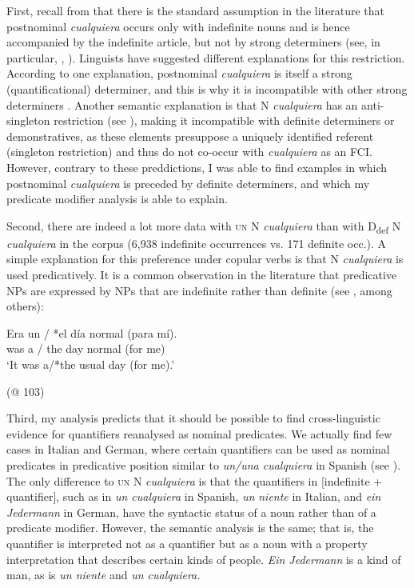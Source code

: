 {First, recall from  that there is the standard assumption in the literature that postnominal \textit{cualquiera} occurs only with indefinite nouns and is hence accompanied by the indefinite article, but not by strong determiners (see, in particular, \citealt{Lapesa1964}, \citealt{Rivero2011}). Linguists have suggested different explanations for this restriction. According to one explanation, postnominal \textit{cualquiera} is itself a strong (quantificational) determiner, and this is why it is incompatible with other strong determiners \citep{Lapesa1964}. Another semantic explanation is that N \textit{cualquiera} has an anti-singleton restriction (see \citealt{Menéndez-Benito2010}), making it incompatible with definite determiners or demonstratives, as these elements presuppose a uniquely identified referent (singleton restriction) and thus do not co-occur with \textit{cualquiera} as an FCI. However, contrary to these preddictions, I was able to find examples in which postnominal \textit{cualquiera} is preceded by definite determiners, and which my predicate modifier analysis is able to explain.

Second, there are indeed a lot more data with \textsc{un} N \textit{cualquiera} than with D\textsubscript{def} N \textit{cualquiera} in the corpus (6,938 indefinite occurrences vs. 171 definite occ.). A simple explanation for this preference under copular verbs is that N \textit{cualquiera} is used predicatively. It is a common observation in the literature that predicative NPs are expressed by NPs that are indefinite rather than definite (see \cite{Geenhoven2005}, among others):

\ea \label{ex:key:178} %
 \gll Era un / *el día normal (para mí).\\
was a / the day normal (for me)\\
\glt ‘It was a/*the usual day (for me).’

  (@ 103)
\z

Third, my analysis predicts that it should be possible to find cross-linguistic evidence for quantifiers reanalysed as nominal predicates. We actually find few cases in Italian and German, where certain quantifiers can be used as nominal predicates in predicative position similar to \textit{un/una cualquiera} in Spanish (see ). The only difference to \textsc{un} N \textit{cualquiera} is that the quantifiers in [indefinite + quantifier], such as in \textit{un cualquiera} in Spanish, \textit{un} \textit{niente} in Italian, and \textit{ein Jedermann} in German, have the syntactic status of a noun rather than of a predicate modifier. However, the semantic analysis is the same; that is, the quantifier is interpreted not as a quantifier but as a noun with a property interpretation that describes certain kinds of people. \textit{Ein Jedermann} is a kind of man, as is \textit{un niente} and \textit{un cualquiera.}

}

